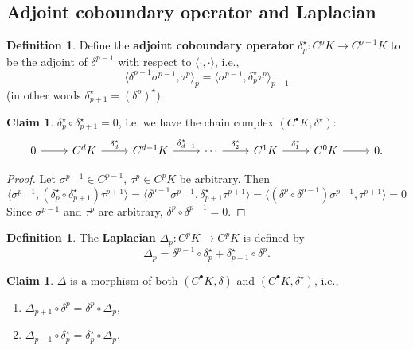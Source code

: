 \documentclass{elsarticle}
\theoremstyle{definition}
\newtheorem{claim}[theorem]{Claim}
\newtheorem{definition}[theorem]{Definition}
\newcommand{\inner}[2]{\langle#1,#2\rangle}
\begin{document}
\subsection{Adjoint coboundary operator and Laplacian}
\label{sec:hodge_general}
\begin{definition}
  Define the \textbf{adjoint coboundary operator} $\delta^\star_p \colon C^p K \to C^{p - 1} K$ to be the adjoint of $\delta^{p - 1}$ with respect to $\inner{\cdot}{\cdot}$, i.e.,
  \begin{equation}
    \inner{\delta^{p - 1} \sigma^{p - 1}}{\tau^p}_p
      = \inner{\sigma^{p - 1}}{\delta^\star_p \tau^p}_{p - 1}
  \end{equation}
  (in other words $\delta^\star_{p + 1} = (\delta^p)^\star$).
\end{definition}
\begin{claim}
  $\delta^\star_p \circ \delta^\star_{p + 1} = 0$, i.e. we have the chain complex
  $(C^{\bullet} K, \delta^\star)$:
  \begin{equation}
    \begin{tikzcd}
      0 \arrow[r, ""] &
      C^d K \arrow[r, "\delta^\star_d"] &
      C^{d - 1} K \arrow[r, "\delta^\star_{d - 1}"] &
      \cdots \arrow[r, "\delta^\star_2"] &
      C^1 K \arrow[r, "\delta^\star_1"] &
      C^0 K \arrow[r, ""] &
      0.
    \end{tikzcd}
  \end{equation}
\end{claim}
\begin{proof}
  Let $\sigma^{p - 1} \in C^{p - 1},\ \tau^p \in C^p K$ be arbitrary. Then
  \begin{equation*}
    \inner{\sigma^{p - 1}}{(\delta^\star_p \circ \delta^\star_{p + 1}) \tau^{p + 1}}
      = \inner{\delta^{p - 1} \sigma^{p - 1}}{\delta^\star_{p + 1} \tau^{p + 1}}
      = \inner{(\delta^p \circ \delta^{p - 1}) \sigma^{p - 1}}{\tau^{p + 1}}
      = 0
  \end{equation*}
  Since $\sigma^{p - 1}$ and $\tau^p$ are arbitrary, $\delta^p \circ \delta^{p - 1} = 0$.
\end{proof}
\begin{definition}
  The \textbf{Laplacian} $\Delta_p \colon C^p K \to C^p K$ is defined by
  \begin{equation}
    \Delta_p = \delta^{p - 1} \circ \delta^\star_p + 
               \delta^\star_{p + 1} \circ \delta^p.
  \end{equation}
\end{definition}
\begin{claim}
  $\Delta$ is a morphism of both $(C^{\bullet} K, \delta)$ and $(C^{\bullet} K, \delta^\star)$, i.e.,
  \begin{enumerate}
    \item 
      $\Delta_{p + 1} \circ \delta^p = \delta^p \circ \Delta_p$,
    \item 
      $\Delta_{p - 1} \circ \delta^\star_p = \delta^\star_p \circ \Delta_p$.
  \end{enumerate}
\end{claim}
\end{document}
